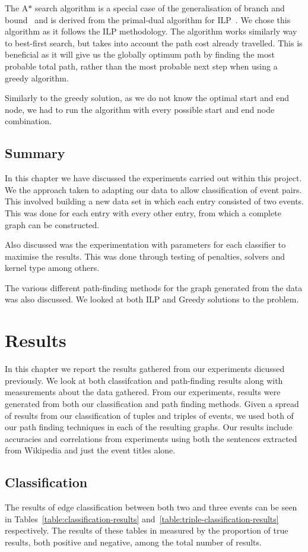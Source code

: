 \documentclass[bsc,frontabs,twoside,singlespacing,parskip,deptreport]{infthesis}     %
\begin{document}
The A$*$ search algorithm is a special case of the generalisation of branch and bound~\cite{balas1983branch} and is derived from the primal-dual algorithm for ILP~\cite{ye2012note}.
We chose this algorithm as it follows the ILP methodology. The algorithm works similarly way to best-first search, but takes into account the path cost already travelled.
This is beneficial as it will give us the globally optimum path by finding the most probable total path, rather than the most probable next step when using a
greedy algorithm.

Similarly to the greedy solution, as we do not know the optimal start and end node, we had to run the algorithm with every possible start and end node combination.


\section{Summary}
In this chapter we have discussed the experiments carried out within this project.
We the approach taken to adapting our data to allow classification of event pairs. This involved building a new data set
in which each entry consisted of two events. This was done for each entry with every other entry, from which a complete
graph can be constructed.

Also discussed was the experimentation with parameters for each classifier to maximise the results. This was done through
testing of penalties, solvers and kernel type among others.

The various different path-finding methods for the graph generated from the data was also discussed.
We looked at both ILP and Greedy solutions to the problem.

\chapter{Results}
In this chapter we report the results gathered from our experiments dicussed previously.
We look at both classifcation and path-finding results along with measurements about the data gathered.
From our experiments, results were generated from both our classification and path finding methods.
Given a spread of results from our classification of tuples and triples of events, we used both of our path finding
techniques in each of the resulting graphs. Our results include accuracies and correlations from
experiments using both the sentences extracted from Wikipedia and just the event titles alone.   

\section{Classification}
The results of edge classification between both two and three events can be seen in Tables~\ref{table:classification-results}
and~\ref{table:triple-classification-results} respectively. The results of these tables in measured by the
proportion of true results, both positive and negative, among the total number of results.
\end{document}
